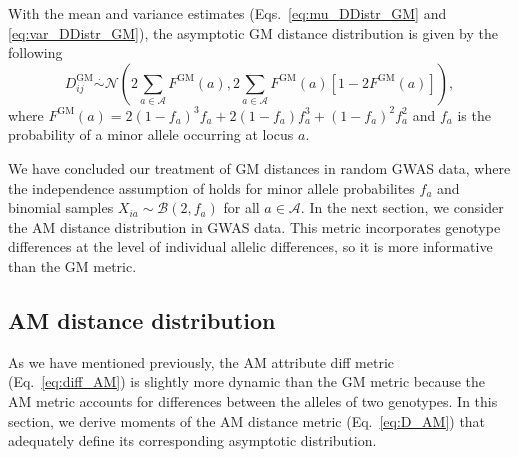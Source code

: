 \documentclass[aoas]{imsart}
\begin{document}
With the mean and variance estimates (Eqs.~\ref{eq:mu_DDistr_GM} and \ref{eq:var_DDistr_GM}), the asymptotic GM distance distribution is given by the following
%
\begin{equation}\label{eq:DDistr_GM}
D^\text{GM}_{ij} \overset{.}{\sim} \mathcal{N}\left(2\sum_{a \in \mathcal{A}} F^\text{GM}(a), 2\sum_{a \in \mathcal{A}} F^\text{GM}(a)[1 - 2F^\text{GM}(a)]\right),
\end{equation}
%
where $F^\text{GM}(a) = 2(1 - f_a)^3f_a + 2(1 - f_a)f^3_a + (1 - f_a)^2f^2_a$ and $f_a$ is the probability of a minor allele occurring at locus $a$.

We have concluded our treatment of GM distances in random GWAS data, where the independence assumption of holds for minor allele probabilites $f_a$ and binomial samples $X_{ia} \sim \mathcal{B}(2,f_a)$ for all $a \in \mathcal{A}$. In the next section, we consider the AM distance distribution in GWAS data. This metric incorporates genotype differences at the level of individual allelic differences, so it is more informative than the GM metric.

\subsection{AM distance distribution}

As we have mentioned previously, the AM attribute diff metric (Eq.~\ref{eq:diff_AM}) is slightly more dynamic than the GM metric because the AM metric accounts for differences between the alleles of two genotypes. In this section, we derive moments of the AM distance metric (Eq.~\ref{eq:D_AM}) that adequately define its corresponding asymptotic distribution.
\end{document}
